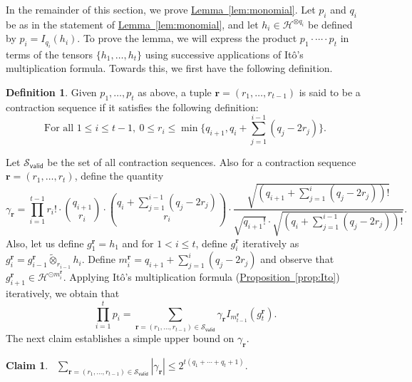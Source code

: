 \documentclass[11pt]{article}
\numberwithin{equation}{section}
\newtheorem{claim}[theorem]{Claim}
\theoremstyle{definition}
\newtheorem{definition}[theorem]{Definition}
\theoremstyle{plain}
\newcommand{\expref}[2]{\hyperref[#2]{#1~\ref{#2}}}
\begin{document}
In the remainder of this section, we prove \expref{Lemma}{lem:monomial}. Let $p_i$ and $q_i$
be as in the statement of \expref{Lemma}{lem:monomial}, and let $h_i \in \mathcal{H}^{\otimes q_i}$
be defined by $p_i = I_{q_i}(h_i)$.
To prove the lemma, we will express the product $p_1 \cdot \cdots \cdot p_t$ in terms of the tensors $\{h_1, \ldots, h_t\}$ using successive applications of It\^{o}'s multiplication formula.  Towards this, we first have the following definition. 
\begin{definition} 
Given $p_1, \ldots, p_t$ as above, a tuple $\mathbf{r} = (r_1, \ldots, r_{t-1})$ is said to be a contraction sequence if it satisfies the following definition: 
\begin{equation}\label{eq:sequence}
\textrm{For all } 1\le i \le t-1, \  0 \le r_i \le \min \bigg\{ q_{i+1}, q_i+ \sum_{j=1}^{i-1} (q_j - 2 r_j) \bigg\}.
\end{equation}
\end{definition}
Let $\mathcal{S}_{\mathsf{valid}}$ be the set of all contraction sequences. 
Also for a contraction sequence $\mathbf{r}=(r_1, \ldots, r_t)$,
define the quantity 
\[
\gamma_{\mathbf{r}} = \prod_{i=1}^{t-1} r_i! \cdot \binom{q_{i+1}}{r_i} \cdot \binom{q_i+ \sum_{j=1}^{i-1} (q_j - 2 r_j) }{r_i} \cdot \frac{\sqrt{(q_{i+1}+ \sum_{j=1}^{i} (q_j - 2 r_j) )!}}{\sqrt{q_{i+1}!} \cdot \sqrt{(q_i+ \sum_{j=1}^{i-1} (q_j - 2 r_j))!}}. 
\]
Also, let us define $g^{\mathbf{r}}_1 = h_1$ and for $1 < i  \le t$, define $g^{\mathbf{r}}_i $ iteratively as $g^{\mathbf{r}}_i  = g^{\mathbf{r}}_{i-1} \widetilde{\otimes}_{r_{i-1}} h_i$. Define  $m^{\mathbf{r}}_i = q_{i+1} + \sum_{j=1}^{i} (q_j - 2 r_j)$ and  observe that $g^{\mathbf{r}}_{i+1}  \in \mathcal{H}^{\odot m^{\mathbf{r}}_i}$. 
Applying It\^{o}'s multiplication formula (\expref{Proposition}{prop:Ito}) iteratively, we obtain that
\begin{equation}\label{eq:Ito1}
\prod_{i=1}^t p_i = \sum_{\mathbf{r} =(r_1, \ldots, r_{t-1}) \in \mathcal{S}_{\mathsf{valid}}} \gamma_{\mathbf{r}} I_{m^{\mathbf{r}}_{t-1}}(g^{\mathbf{r}}_{t}).
\end{equation}
The next claim establishes a simple upper bound on $\gamma_{\mathbf{r}}$. 
\begin{claim}~\label{clm:bound-easy1}
$\sum_{\mathbf{r} =(r_1, \ldots, r_{t-1}) \in \mathcal{S}_{\mathsf{valid}}} |\gamma_{\mathbf{r}}| \le 2^{t (q_1 + \cdots + q_t +1 )}. $
\end{claim}
\end{document}
